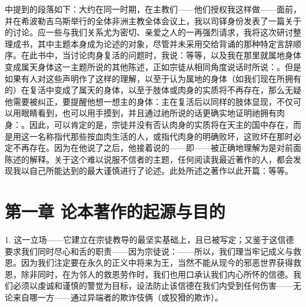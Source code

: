 中提到的段落如下：大约在同一时期，在主教们——他们授权我这样做——面前，并在希波勒吉乌斯举行的全体非洲主教全体会议上，我以司铎身份发表了一篇关于的讨论。应一些与我们关系尤为密切、亲爱之人的一再强烈请求，我将这次研讨整理成书，其中主题本身成为论述的对象，尽管并未采用交给背诵的那种特定言辞顺序。在此书中，当讨论肉身复活的问题时，我说：等等，以及我在那里就属地身体变成属天身体这一主题所说的其他陈述，正如宗徒从相同角度说话时所说：。但是如果有人对这些声明作了这样的理解，以至于认为属地的身体（如我们现在所拥有的）在复活中变成了属天的身体，以至于肢体或肉身的实质将不再存在，那么无疑他需要被纠正，要提醒他想一想主的身体：主在复活后以同样的肢体显现，不仅可以用眼睛看到，也可以用手摸到，并且通过祂所说的话更确实地证明祂拥有肉身：。因此，可以肯定的是，宗徒并没有否认肉身的实质将在天主的国中存在，而是用这一名称指代那些按血肉生活的人，或指代肉身的明确败坏，这败坏在那时必定不再存在。因为在他说了之后，他接着说的——即——被正确地理解为是对前面陈述的解释。关于这个难以说服不信者的主题，任何阅读我最近著作的人，都会发现我以自己所能达到的最大谨慎进行了论述。此处所述之著作以此开篇：等等。\par


\section{第一章 论本著作的起源与目的}

1. 这一立场——它建立在宗徒教导的最坚实基础上，且已被写定；又鉴于这信德要求我们同时尽心和舌的职责——因为宗徒说：——所以，我们理当牢记成义与救恩。因为我们注定要在永久的正义中将来为王，当然不能从现今的邪恶世界获得救恩，除非同时，在为邻人的救恩劳作时，我们也用口承认我们内心所怀的信德。我们必须以虔诚和谨慎的警觉为目标，设法防止该信德在我们内受到任何伤害——无论来自哪一方——通过异端者的欺诈伎俩（或狡猾的欺诈）。\par

